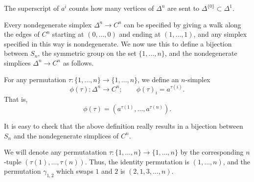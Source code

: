 \documentclass[main.tex]{subfiles}
\begin{document}
\begin{note}
  The superscript of $a^{i}$ counts how many vertices of $\Delta^{n}$ are sent to $\Delta^{\{0\}} \subset \Delta^{1}$.
\end{note}

Every nondegenerate simplex $\Delta^{n} \to C^{n}$ can be specified by giving a walk along the edges of $C^{n}$ starting at $(0, \ldots, 0)$ and ending at $(1, \ldots, 1)$, and any simplex specified in this way is nondegenerate. We now use this to define a bijection between $S_{n}$, the symmetric group on the set $\{1, \ldots, n\}$, and the nondegenerate simplices $\Delta^{n} \to C^{n}$ as follows.

\begin{definition}
  For any permutation $\tau\colon \{1, \ldots, n\} \to \{1, \ldots, n\}$, we define an $n$-simplex
  \begin{equation*}
    \phi(\tau)\colon \Delta^{n} \to C^{n};\qquad \phi(\tau)_{i} = a^{\tau(i)}.
  \end{equation*}
  That is,
  \begin{equation*}
    \phi(\tau) = (a^{\tau(1)}, \ldots, a^{\tau(n)}).
  \end{equation*}
\end{definition}

\begin{note}
  It is easy to check that the above definition really results in a bijection between $S_{n}$ and the nondegenerate simplices of $C^{n}$.
\end{note}

\begin{notation}
  We will denote any permutatation $\tau\colon \{1, \ldots, n\} \to \{1, \ldots, n\}$ by the corresponding $n$-tuple $(\tau(1), \ldots, \tau(n))$. Thus, the identity permutation is $(1, \ldots, n)$, and the permutation $\gamma_{1,2}$ which swaps $1$ and $2$ is $(2, 1, 3, \ldots, n)$.
\end{notation}
\end{document}
